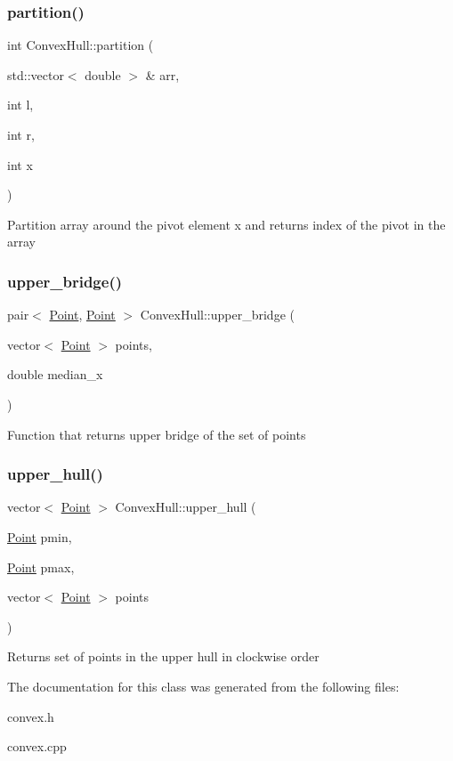 \subsubsection{\texorpdfstring{partition()}{partition()}}
{\footnotesize\ttfamily int Convex\+Hull\+::partition (\begin{DoxyParamCaption}\item[{std\+::vector$<$ double $>$ \&}]{arr,  }\item[{int}]{l,  }\item[{int}]{r,  }\item[{int}]{x }\end{DoxyParamCaption})\hspace{0.3cm}{\ttfamily [private]}}

Partition array around the pivot element \textquotesingle{}x\textquotesingle{} and returns index of the pivot in the array \mbox{\label{classConvexHull_a7efe590d1b83a1459dc4ccae4e59bf5b}} 
\subsubsection{\texorpdfstring{upper\+\_\+bridge()}{upper\_bridge()}}
{\footnotesize\ttfamily pair$<$ \hyperlink{classPoint}{Point}, \hyperlink{classPoint}{Point} $>$ Convex\+Hull\+::upper\+\_\+bridge (\begin{DoxyParamCaption}\item[{vector$<$ \hyperlink{classPoint}{Point} $>$}]{points,  }\item[{double}]{median\+\_\+x }\end{DoxyParamCaption})\hspace{0.3cm}{\ttfamily [private]}}

Function that returns upper bridge of the set of points \mbox{\label{classConvexHull_a9c8c6225b24b35b43c9d7dea05b76023}} 
\subsubsection{\texorpdfstring{upper\+\_\+hull()}{upper\_hull()}}
{\footnotesize\ttfamily vector$<$ \hyperlink{classPoint}{Point} $>$ Convex\+Hull\+::upper\+\_\+hull (\begin{DoxyParamCaption}\item[{\hyperlink{classPoint}{Point}}]{pmin,  }\item[{\hyperlink{classPoint}{Point}}]{pmax,  }\item[{vector$<$ \hyperlink{classPoint}{Point} $>$}]{points }\end{DoxyParamCaption})\hspace{0.3cm}{\ttfamily [private]}}

Returns set of points in the upper hull in clockwise order 

The documentation for this class was generated from the following files\+:\begin{DoxyCompactItemize}
\item 
convex.\+h\item 
convex.\+cpp\end{DoxyCompactItemize}

